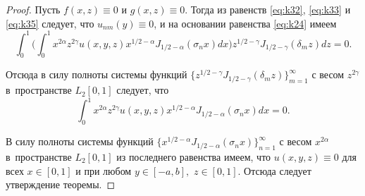 \begin{proof}
	Пусть $f(x,z)\equiv0$ и $g(x,z)\equiv0.$ Тогда из равенств \eqref{eq:k32}, \eqref{eq:k33} и \eqref{eq:k35} следует, что $u_{nm}(y)\equiv0$, и на основании равенства \eqref{eq:k24} имеем
$$
\int_0^1 
\biggl(\int_0^1{x^{2\alpha}z^{2\gamma}u(x,y,z)x^{ 1/2 -\alpha}J_{ 1/2 -\alpha}(\sigma_n x)dx}\biggr)z^{ 1/2 -\gamma}J_{ 1/2 -\gamma}(\delta_m z)dz=0.
$$





Отсюда в силу полноты системы функций $\bigl\{z^{ 1/2 -\gamma}J_{ 1/2 -\gamma}(\delta_m z)\bigr\}_{m=1}^\infty$  с весом $z^{2\gamma} $ в~пространстве $L_2[0,1]$ следует, что 
$$
\int_0^1 x^{2\alpha} z^{2\gamma} u(x,y,z)x^{ 1/2 -\alpha}J_{ 1/2 -\alpha}(\sigma_n x)dx=0.
$$

	В силу полноты системы функций $\bigl\{x^{ 1/2 -\alpha}J_{ 1/2 -\alpha}(\sigma_n x)\bigr\}_{n=1}^\infty$ с весом $x^{2\alpha}$ в~пространстве $L_2[0,1]$ из последнего равенства имеем, что $u(x,y,z)\equiv0$  для всех $x\in[0,1]$ и при любом $y\in[-a,b],$ $z\in[0,1].$ Отсюда следует утверждение теоремы. \hfill \end{proof}

\smallskip





